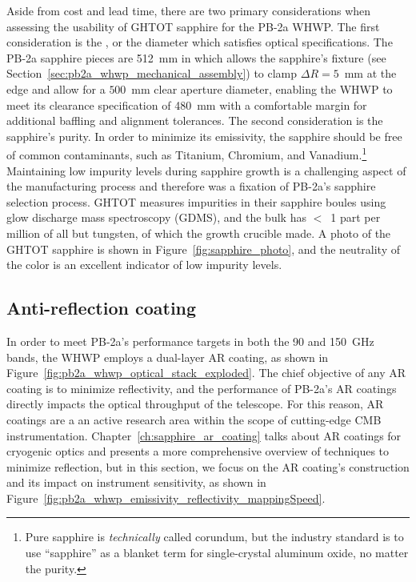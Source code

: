 Aside from cost and lead time, there are two primary considerations when assessing the usability of GHTOT sapphire for the PB-2a WHWP. The first consideration is the , or the diameter which satisfies optical specifications. The PB-2a sapphire pieces are 512~mm in which allows the sapphire's fixture (see Section~\ref{sec:pb2a_whwp_mechanical_assembly}) to clamp $\Delta R = 5$~mm at the edge and allow for a $500$~mm clear aperture diameter, enabling the WHWP to meet its clearance specification of 480~mm with a comfortable margin for additional baffling and alignment tolerances. The second consideration is the sapphire's purity. In order to minimize its emissivity, the sapphire should be free of common contaminants, such as Titanium, Chromium, and Vanadium.\footnote{Pure sapphire is \textit{technically} called corundum, but the industry standard is to use ``sapphire'' as a blanket term for single-crystal aluminum oxide, no matter the purity.} Maintaining low impurity levels during sapphire growth is a challenging aspect of the manufacturing process and therefore was a fixation of PB-2a's sapphire selection process. GHTOT measures impurities in their sapphire boules using glow discharge mass spectroscopy (GDMS), and the bulk has $<$~1 part per million of all but tungsten, of which the growth crucible made. A photo of the GHTOT sapphire is shown in Figure~\ref{fig:sapphire_photo}, and the neutrality of the color is an excellent indicator of low impurity levels.


\subsection{Anti-reflection coating}
\label{sec:pb2a_whwp_ar_coating}

In order to meet PB-2a's performance targets in both the 90 and 150~GHz bands, the WHWP employs a dual-layer AR coating, as shown in Figure~\ref{fig:pb2a_whwp_optical_stack_exploded}. The chief objective of any AR coating is to minimize reflectivity, and the performance of PB-2a's AR coatings directly impacts the optical throughput of the telescope. For this reason, AR coatings are a an active research area within the scope of cutting-edge CMB instrumentation. Chapter~\ref{ch:sapphire_ar_coating} talks about AR coatings for cryogenic optics and presents a more comprehensive overview of techniques to minimize reflection, but in this section, we focus on the AR coating's construction and its impact on instrument sensitivity, as shown in Figure~\ref{fig:pb2a_whwp_emissivity_reflectivity_mappingSpeed}.

